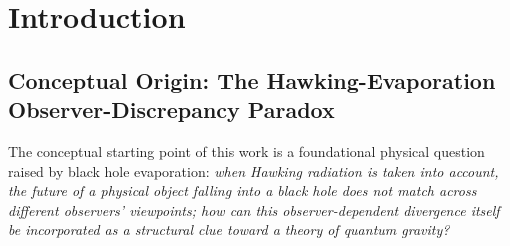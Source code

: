 \documentclass[11pt,a4paper]{article}
\theoremstyle{definition}
\theoremstyle{remark}
\newcommand{\cE}{\mathcal{E}}
\newcommand{\cR}{\mathcal{R}}
\newcommand{\1}{\mathbf{1}}
\begin{document}
\begin{abstract}
(5)~Specializing Farber and Gour's unassisted single-shot quantum compression theorem to maximally mixed inputs, we give an elementary Lean-verified Kraus proof (covering both $d_f\le d_C$ and $d_f>d_C$) of $F_e(\cR\circ\cE) \le \min(1, d_f^2/d_C^2)$, audit its no-classical-side-channel resource requirement via a 1-bit flag counterexample ($F_e=1/2>1/4$), and present a two-window $t$-encoding/$s$-invariance evaporation example alongside a fixed-cutoff $SU(2)$ Yang--Mills Galerkin benchmark.
\end{abstract}

\newpage
\tableofcontents
\vspace{1em}

\section{Introduction}\label{sec:intro}

\subsection{Conceptual Origin: The Hawking-Evaporation Observer-Discrepancy Paradox}\label{sec:origin}

The conceptual starting point of this work is a foundational physical question raised by black hole evaporation: \emph{when Hawking radiation is taken into account, the future of a physical object falling into a black hole does not match across different observers' viewpoints; how can this observer-dependent divergence itself be incorporated as a structural clue toward a theory of quantum gravity?}
\end{document}

